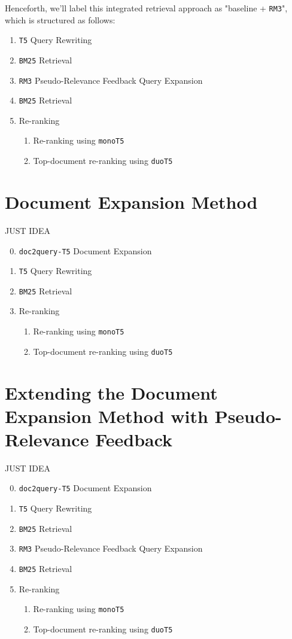 \documentclass[sigconf]{acmart}
\begin{document}
Henceforth, we'll label this integrated retrieval approach as "baseline + \texttt{RM3}", which is structured as follows:
\begin{enumerate}
	\item	\texttt{T5} Query Rewriting
	\item	\texttt{BM25} Retrieval
	\item	\texttt{RM3} Pseudo-Relevance Feedback Query Expansion
	\item	\texttt{BM25} Retrieval
	\item	Re-ranking
			\begin{enumerate}
				\item	Re-ranking using \texttt{monoT5}
				\item	Top-document re-ranking using \texttt{duoT5}
			\end{enumerate}
\end{enumerate}

\section{Document Expansion Method}\label{sec:doc2query-method}
JUST IDEA
\begin{enumerate}
	\setcounter{enumi}{-1}
	\item	\texttt{doc2query-T5} Document Expansion
	\item	\texttt{T5} Query Rewriting
	\item	\texttt{BM25} Retrieval
	\item	Re-ranking
			\begin{enumerate}
				\item	Re-ranking using \texttt{monoT5}
				\item	Top-document re-ranking using \texttt{duoT5}
			\end{enumerate}
\end{enumerate}

\section{Extending the Document Expansion Method with Pseudo-Relevance Feedback}\label{sec:doc2query-method+rm3}
JUST IDEA
\begin{enumerate}
	\setcounter{enumi}{-1}
	\item	\texttt{doc2query-T5} Document Expansion
	\item	\texttt{T5} Query Rewriting
	\item	\texttt{BM25} Retrieval
	\item	\texttt{RM3} Pseudo-Relevance Feedback Query Expansion
	\item	\texttt{BM25} Retrieval
	\item	Re-ranking
			\begin{enumerate}
				\item	Re-ranking using \texttt{monoT5}
				\item	Top-document re-ranking using \texttt{duoT5}
			\end{enumerate}
\end{enumerate}
\end{document}
